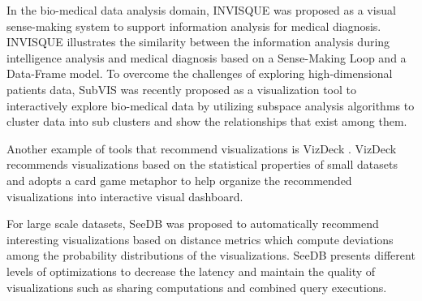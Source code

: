 In the bio-medical data analysis domain, INVISQUE \cite{Wong2011,DBLP:conf/chi/WongCKRX11} was proposed as a visual sense-making system to support information analysis for medical diagnosis. 
%
INVISQUE illustrates the similarity between the information analysis during intelligence analysis and medical diagnosis based on a Sense-Making Loop and a Data-Frame model.
%
To overcome the challenges of exploring high-dimensional patients data,  SubVIS \cite{Hund2016} was recently proposed as a visualization tool to interactively explore bio-medical data by utilizing subspace analysis algorithms to cluster data into sub clusters and show the relationships that exist among them.

Another example of tools that recommend visualizations is VizDeck \cite{DBLP:conf/sigmod/KeyHPA12}. 
%
VizDeck recommends visualizations based on the statistical properties of small datasets and adopts a card game metaphor 
to help organize the recommended visualizations into interactive visual dashboard.
%
%

For large scale datasets, SeeDB \cite{DBLP:journals/pvldb/VartakMPP14} was proposed to automatically recommend interesting visualizations based on distance metrics which compute deviations among the probability distributions of the 
visualizations. 
%
SeeDB presents different levels of optimizations to decrease the latency and maintain the quality of visualizations such as sharing computations and combined query executions.
%

